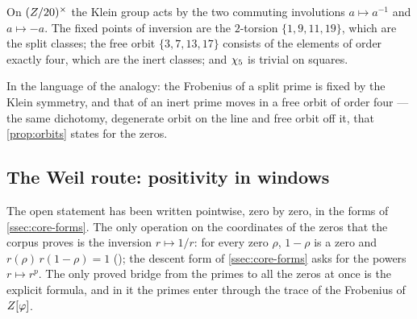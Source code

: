\begin{proposition}\label{prop:split-inert-orbits}
On $(Z/20)^{\times}$ the Klein group acts by the two commuting involutions $a\mapsto a^{-1}$ and
$a\mapsto-a$.  The fixed points of inversion are the $2$-torsion $\{1,9,11,19\}$, which
are the split classes; the free orbit $\{3,7,13,17\}$ consists of the elements of order
exactly four, which are the inert classes; and $\chi_5$ is trivial on squares.
%
\end{proposition}

In the language of the analogy: the Frobenius of a split prime is fixed by the Klein
symmetry, and that of an inert prime moves in a free orbit of order four --- the same
dichotomy, degenerate orbit on the line and free orbit off it, that
\cref{prop:orbits} states for the zeros.

\subsection{The Weil route: positivity in windows}\label{ssec:weil-route}

The open statement has been written pointwise, zero by zero, in the forms of
\cref{ssec:core-forms}.  The only operation on the coordinates of the zeros that the
corpus proves is the inversion $r\mapsto1/r$: for every zero $\rho$, $1-\rho$ is a zero and
$r(\rho)\,r(1-\rho)=1$ (); the
descent form of \cref{ssec:core-forms} asks for the powers $r\mapsto r^p$.  The only proved bridge from the primes to
all the zeros at once is the explicit formula, and in it the primes enter
through the trace of the Frobenius of $Z[\varphi]$.



